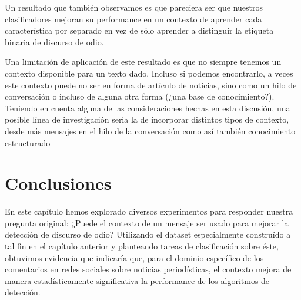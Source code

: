 Un resultado que también observamos es que pareciera ser que nuestros clasificadores mejoran su performance en un contexto de aprender cada característica por separado en vez de sólo aprender a distinguir la etiqueta binaria de discurso de odio.

Una limitación de aplicación de este resultado es que no siempre tenemos un contexto disponible para un texto dado. Incluso si podemos encontrarlo, a veces este contexto puede no ser en forma de artículo de noticias, sino como un hilo de conversación o incluso de alguna otra forma (¿una base de conocimiento?). Teniendo en cuenta alguna de las consideraciones hechas en esta discusión, una posible línea de investigación seria la de incorporar distintos tipos de contexto, desde más mensajes en el hilo de la conversación como así también conocimiento estructurado 

\section{Conclusiones}

En este capítulo hemos explorado diversos experimentos para responder nuestra pregunta original: ¿Puede el contexto de un mensaje ser usado para mejorar la detección de discurso de odio? Utilizando el dataset especialmente construído a tal fin en el capítulo anterior y planteando tareas de clasificación sobre éste, obtuvimos evidencia que indicaría que, para el dominio específico de los comentarios en redes sociales sobre noticias periodísticas, el contexto mejora de manera estadísticamente significativa la performance de los algoritmos de detección.